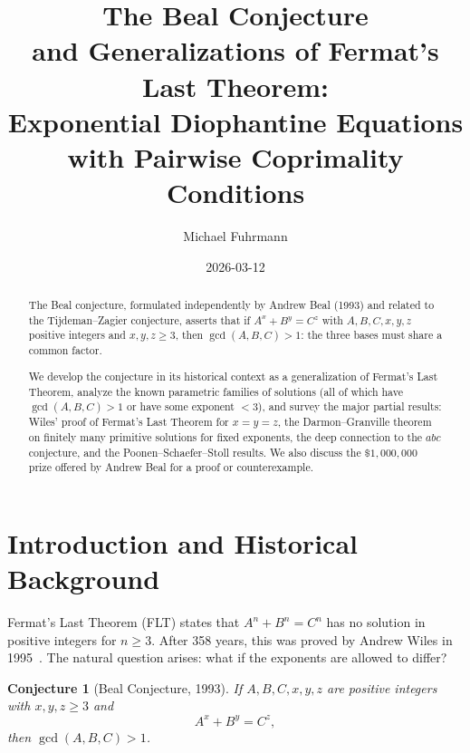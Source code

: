 \documentclass[12pt,a4paper]{amsart}
\newtheorem{conjecture}[theorem]{Conjecture}
\theoremstyle{definition}
\theoremstyle{remark}
\begin{document}
\title{The Beal Conjecture\\
and Generalizations of Fermat's Last Theorem:\\
Exponential Diophantine Equations\\
with Pairwise Coprimality Conditions}

\author{Michael Fuhrmann}
\address{Specialist Mathematics Project, Build 166}
\date{2026-03-12}

\begin{abstract}
The Beal conjecture, formulated independently by Andrew Beal (1993) and
related to the Tijdeman--Zagier conjecture, asserts that if $A^x + B^y = C^z$
with $A, B, C, x, y, z$ positive integers and $x, y, z \geq 3$, then
$\gcd(A, B, C) > 1$: the three bases must share a common factor.

We develop the conjecture in its historical context as a generalization of
Fermat's Last Theorem, analyze the known parametric families of solutions
(all of which have $\gcd(A,B,C) > 1$ or have some exponent $< 3$), and
survey the major partial results: Wiles' proof of Fermat's Last Theorem for
$x = y = z$, the Darmon--Granville theorem on finitely many primitive solutions
for fixed exponents, the deep connection to the $abc$ conjecture, and the
Poonen--Schaefer--Stoll results. We also discuss the $\$1{,}000{,}000$ prize
offered by Andrew Beal for a proof or counterexample.
\end{abstract}

\maketitle

\tableofcontents

\section{Introduction and Historical Background}

Fermat's Last Theorem (FLT) states that $A^n + B^n = C^n$ has no solution in
positive integers for $n \geq 3$. After 358 years, this was proved by Andrew
Wiles in 1995~\cite{Wiles95}. The natural question arises: what if the exponents
are allowed to differ?

\begin{conjecture}[Beal Conjecture, 1993]\label{conj:beal}
If $A, B, C, x, y, z$ are positive integers with $x, y, z \geq 3$ and
\[
  A^x + B^y = C^z,
\]
then $\gcd(A, B, C) > 1$.
\end{conjecture}
\end{document}
